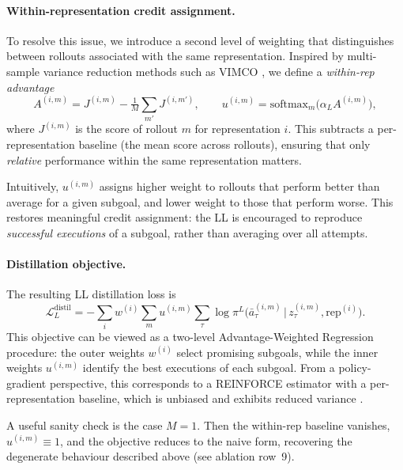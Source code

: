 \paragraph{Within-representation credit assignment.}
To resolve this issue, we introduce a second level of weighting that
distinguishes between rollouts associated with the same
representation. Inspired by multi-sample variance reduction methods
such as VIMCO \citep{vimco}, we define a \emph{within-rep advantage}
\begin{equation}
A^{(i,m)} = J^{(i,m)} - \tfrac{1}{M}\sum_{m'} J^{(i,m')},\qquad
u^{(i,m)} = \mathrm{softmax}_m\!\big(\alpha_L A^{(i,m)}\big),
\label{eq:wgsp-distil-u-rewrite}
\end{equation}
where $J^{(i,m)}$ is the score of rollout $m$ for representation $i$.
This subtracts a per-representation baseline (the mean score across
rollouts), ensuring that only \emph{relative} performance within the
same representation matters.

Intuitively, $u^{(i,m)}$ assigns higher weight to rollouts that perform
better than average for a given subgoal, and lower weight to those that
perform worse. This restores meaningful credit assignment: the LL is
encouraged to reproduce \emph{successful executions} of a subgoal,
rather than averaging over all attempts.

\paragraph{Distillation objective.}
The resulting LL distillation loss is
\begin{equation}
\boxed{\;\mathcal{L}_L^\text{distil}
= -\sum_i w^{(i)}\sum_m u^{(i,m)}\sum_\tau
\log\pi^L\!\big(\bar a_\tau^{(i,m)}\,\big|\,z_\tau^{(i,m)},\text{rep}^{(i)}\big).\;}
\label{eq:wgsp-distil-rewrite}
\end{equation}
This objective can be viewed as a two-level Advantage-Weighted
Regression procedure: the outer weights $w^{(i)}$ select promising
subgoals, while the inner weights $u^{(i,m)}$ identify the best
executions of each subgoal. From a policy-gradient perspective, this
corresponds to a REINFORCE estimator with a per-representation
baseline, which is unbiased and exhibits reduced variance
\citep{reinforce-baseline,vimco}.

A useful sanity check is the case $M=1$. Then the within-rep baseline
vanishes, $u^{(i,m)} \equiv 1$, and the objective reduces to the naive
form, recovering the degenerate behaviour described above (see
ablation row~9).

